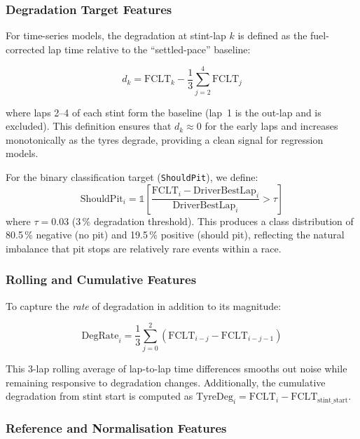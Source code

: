 \documentclass[journal,twoside]{IEEEtran}
\begin{document}
\subsubsection{Degradation Target Features}

For time-series models, the degradation at stint-lap $k$ is defined as
the fuel-corrected lap time relative to the ``settled-pace'' baseline:

\begin{equation}
  d_k = \text{FCLT}_k - \frac{1}{3}\sum_{j=2}^{4}\text{FCLT}_j
  \label{eq:deg_target}
\end{equation}

\noindent where laps 2--4 of each stint form the baseline (lap~1 is
the out-lap and is excluded).  This definition ensures that
$d_k \approx 0$ for the early laps and increases monotonically as the
tyres degrade, providing a clean signal for regression models.

For the binary classification target (\texttt{ShouldPit}), we define:
\begin{equation}
  \text{ShouldPit}_i = \mathbb{1}\left[\frac{\text{FCLT}_i -
  \text{DriverBestLap}_i}{\text{DriverBestLap}_i} > \tau\right]
  \label{eq:should_pit}
\end{equation}
where $\tau = 0.03$ (3\,\% degradation threshold).  This produces a
class distribution of 80.5\,\% negative (no pit) and 19.5\,\% positive
(should pit), reflecting the natural imbalance that pit stops are
relatively rare events within a race.

\subsubsection{Rolling and Cumulative Features}

To capture the \emph{rate} of degradation in addition to its magnitude:

\begin{equation}
  \text{DegRate}_i = \frac{1}{3}\sum_{j=0}^{2}
  (\text{FCLT}_{i-j} - \text{FCLT}_{i-j-1})
  \label{eq:deg_rate}
\end{equation}

\noindent This 3-lap rolling average of lap-to-lap time differences
smooths out noise while remaining responsive to degradation changes.
Additionally, the cumulative degradation from stint start is computed
as $\text{TyreDeg}_i = \text{FCLT}_i - \text{FCLT}_{\text{stint\_start}}$.

\subsubsection{Reference and Normalisation Features}
\end{document}
